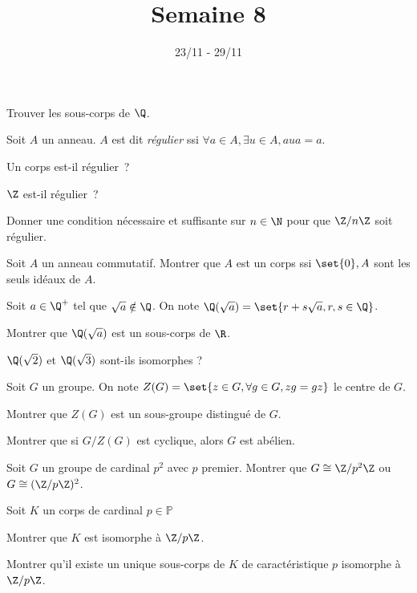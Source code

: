 \documentclass[11pt,a4paper]{article}
\begin{document}
\title{Semaine 8}
\author{}
\date{23/11 - 29/11 }

\maketitle

\begin{exercise}
    Trouver les sous-corps de $\Q$.
\end{exercise} 

\begin{exercise}
    Soit $A$ un anneau. $A$ est dit \textit{régulier} ssi $\forall a \in A, \exists u \in A, a u a = a$.
    \begin{questions}
        \item Un corps est-il régulier~?
        \item $\Z$ est-il régulier~?
        \item Donner une condition nécessaire et suffisante sur $n \in \N$ pour que $\Z / n \Z$ soit régulier.
    \end{questions}
\end{exercise}

\begin{exercise}
Soit $A$ un anneau commutatif.
Montrer que $A$ est un corps ssi $\set{0},A$ sont les seuls idéaux de $A$.
\end{exercise}

\begin{exercise}
Soit $a\in\Q^+$ tel que $\sqrt{a}\notin\Q$.
On note $\Q(\sqrt{a})=\set{r+s\sqrt{a}, r,s\in\Q}$.
\begin{questions}
\item Montrer que $\Q(\sqrt{a})$ est un sous-corps de $\R$.
\item $\Q(\sqrt{2})$ et $\Q(\sqrt{3})$ sont-ils isomorphes ?
\end{questions}
\end{exercise}

\begin{exercise}
Soit $G$ un groupe.
On note $Z(G)=\set{z\in G, \forall g\in G, zg=gz}$ le centre de $G$.
\begin{questions}
\item Montrer que $Z(G)$ est un sous-groupe distingué de $G$.
\item Montrer que si $G/Z(G)$ est cyclique, alors $G$ est abélien.
\end{questions}
\end{exercise}

\begin{exercise}
Soit $G$ un groupe de cardinal $p^2$ avec $p$ premier.
Montrer que $G\cong \Z/p^2\Z$ ou $G\cong (\Z/p\Z)^2$.
\end{exercise}

\begin{exercise}
Soit $K$ un corps de cardinal $p\in\mathbb{P}$
\begin{questions}
\item Montrer que $K$ est isomorphe à $\Z/p\Z$.
\item Montrer qu'il existe un unique sous-corps de $K$ de caractéristique $p$ isomorphe à $\Z/p\Z$.
\end{questions}
\end{exercise}
\end{document}
